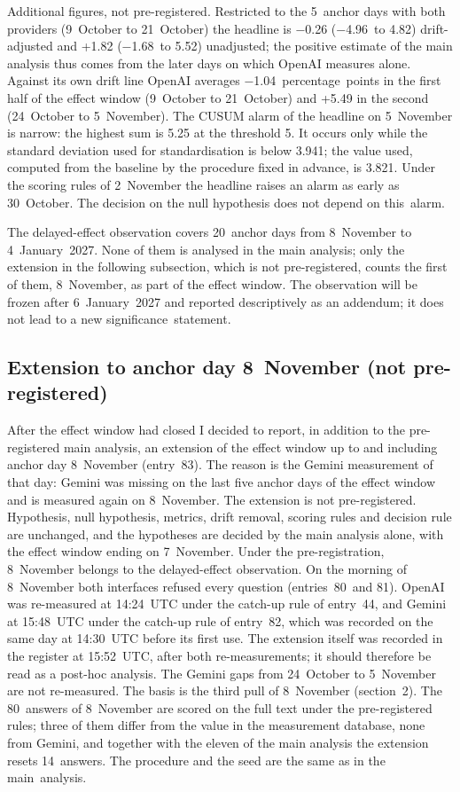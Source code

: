 \documentclass[11pt]{article}
\newcounter{none}
\begin{document}
Additional figures, not pre-registered. Restricted to the 5~anchor days with both providers (9~October to 21~October) the headline is −0.26 (−4.96~to 4.82) drift-adjusted and +1.82 (−1.68~to 5.52) unadjusted; the positive estimate of the main analysis thus comes from the later days on which OpenAI measures alone. Against its own drift line OpenAI averages −1.04~percentage~points in the first half of the effect window (9~October to 21~October) and +5.49 in the second (24~October to 5~November). The CUSUM alarm of the headline on 5~November is narrow: the highest sum is 5.25 at the threshold 5. It occurs only while the standard deviation used for standardisation is below 3.941; the value used, computed from the baseline by the procedure fixed in advance, is 3.821. Under the scoring rules of 2~November the headline raises an alarm as early as 30~October. The decision on the null hypothesis does not depend on this~\mbox{alarm.}

The delayed-effect observation covers 20~anchor days from 8~November to 4~January~2027. None of them is analysed in the main analysis; only the extension in the following subsection, which is not pre-registered, counts the first of them, 8~November, as part of the effect window. The observation will be frozen after 6~January~2027 and reported descriptively as an addendum; it does not lead to a new significance~\mbox{statement.}

\subsection{Extension to anchor day 8~November (not pre-registered)}

After the effect window had closed I decided to report, in addition to the pre-registered main analysis, an extension of the effect window up to and including anchor day 8~November (entry~83). The reason is the Gemini measurement of that day: Gemini was missing on the last five anchor days of the effect window and is measured again on 8~November. The extension is not pre-registered. Hypothesis, null hypothesis, metrics, drift removal, scoring rules and decision rule are unchanged, and the hypotheses are decided by the main analysis alone, with the effect window ending on 7~November. Under the pre-registration, 8~November belongs to the delayed-effect observation. On the morning of 8~November both interfaces refused every question (entries~80~and 81). OpenAI was re-measured at 14:24~UTC under the catch-up rule of entry~44, and Gemini at 15:48~UTC under the catch-up rule of entry~82, which was recorded on the same day at 14:30~UTC before its first use. The extension itself was recorded in the register at 15:52~UTC, after both re-measurements; it should therefore be read as a post-hoc analysis. The Gemini gaps from 24~October to 5~November are not re-measured. The basis is the third pull of 8~November (section~2). The 80~answers of 8~November are scored on the full text under the pre-registered rules; three of them differ from the value in the measurement database, none from Gemini, and together with the eleven of the main analysis the extension resets 14~answers. The procedure and the seed are the same as in the main~\mbox{analysis.}
\end{document}
